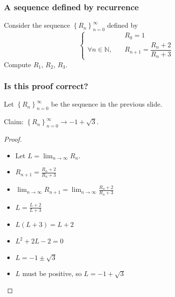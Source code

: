 \documentclass[14pt]{beamer}
\begin{document}
\begin{frame}[t]
	\frametitle{A sequence defined by recurrence}

	Consider the sequence $\displaystyle \left\{ R_{n} \right\}_{n=0}^{\infty}$
	defined by
	\begin{equation*}
		\begin{cases}
			                                & R_{0}= 1                           \\
			\forall n \in \mathbb{N}, \quad & R_{n+1}= \dfrac{ R_n + 2}{R_n + 3}
		\end{cases}
	\end{equation*}
	Compute $\displaystyle R_{1}, \, R_{2}, \, R_{3}$.
\end{frame}

\begin{frame}[t]
	\fontsize{13}{13}\selectfont
	\frametitle{Is this proof correct?}
	Let $\displaystyle \left\{ R_{n} \right\}_{n=0}^{\infty}$ be the sequence in
	the previous slide.
	\begin{block}{Claim:}
		$\displaystyle \left\{ R_{n} \right\}_{n=0}^{\infty}\longrightarrow -1 + \sqrt{3}$.
	\end{block}
	\begin{proof}
		\begin{multicols}{2}
			\begin{itemize}
				\item Let $\displaystyle L = \lim_{n \to \infty}R_{n}$.

				\item $\displaystyle R_{n+1}= \frac{R_{n}+ 2}{ R_{n}+ 3}$

				\item $\displaystyle \lim_{n \to \infty }R_{n+1}= \lim_{n \to \infty }\frac{R_{n}+
					2}{ R_{n}+ 3}$

				\item $\displaystyle L = \frac{L + 2}{ L + 3}$

				\item $\displaystyle L(L+3) = L + 2$

				\item $\displaystyle L^{2}+2L - 2 = 0$

				\item $\displaystyle L = -1 \pm \sqrt{3}$

				\item $\displaystyle L$ must be positive, so
					$\displaystyle L = -1 + \sqrt{3}$
			\end{itemize}
		\end{multicols}
	\end{proof}
\end{frame}
\end{document}
